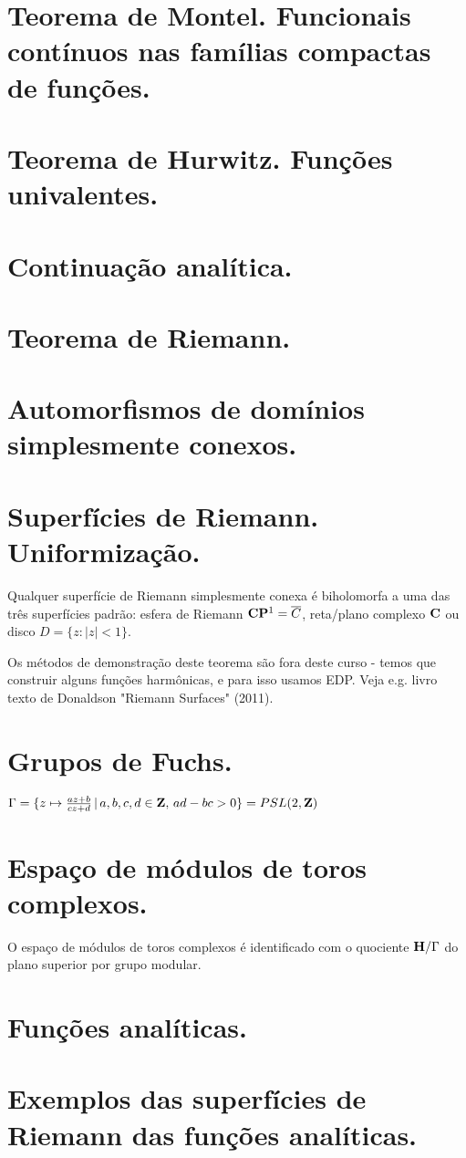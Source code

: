 \section{Teorema de Montel. Funcionais contínuos nas famílias compactas de funções.}

\section{Teorema de Hurwitz. Funções univalentes.}

\section{Continuação analítica.}

\section{Teorema de Riemann.}

\section{Automorfismos de domínios simplesmente conexos.}

\section{Superfícies de Riemann. Uniformização.}

\begin{teorema}
Qualquer superfície de Riemann simplesmente conexa é biholomorfa a uma das três superfícies padrão:
esfera de Riemann $\mathbf{C}\mathbf{P}^1 = \overline{C}$, reta/plano complexo $\mathbf{C}$ ou disco $D = \{z : |z|<1\}$.
\end{teorema}
Os métodos de demonstração deste teorema são fora deste curso - temos que construir alguns funções
harmônicas, e para isso usamos EDP. Veja e.g. livro texto de Donaldson "Riemann Surfaces" (2011).

\section{Grupos de Fuchs.}

\begin{exem}
$\Gamma = \{ z \mapsto \frac{az+b}{cz+d} \,|\, a,b,c,d\in\mathbf{Z}, \, ad-bc>0 \} = PSL(2,\mathbf{Z})$
\end{exem}

\section{Espaço de módulos de toros complexos.}

\begin{teorema}
O espaço de módulos de toros complexos é identificado com o quociente $\mathbf{H}/\Gamma$
do plano superior por grupo modular.
\end{teorema}

\section{Funções analíticas.}

\section{Exemplos das superfícies de Riemann das funções analíticas.}
